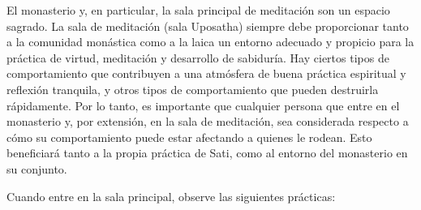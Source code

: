 El monasterio y, en particular, la sala principal de meditación son un espacio sagrado. La sala de meditación (sala Uposatha) siempre debe proporcionar tanto a la comunidad monástica como a la laica un entorno adecuado y propicio para la práctica de virtud, meditación y desarrollo de sabiduría. Hay ciertos tipos de comportamiento que contribuyen a una atmósfera de buena práctica espiritual y reflexión tranquila, y otros tipos de comportamiento que pueden destruirla rápidamente. Por lo tanto, es importante que cualquier persona que entre en el monasterio y, por extensión, en la sala de meditación, sea considerada respecto a cómo su comportamiento puede estar afectando a quienes le rodean. Esto beneficiará tanto a la propia práctica de Sati, como al entorno del monasterio en su conjunto.

Cuando entre en la sala principal, observe las siguientes prácticas:


